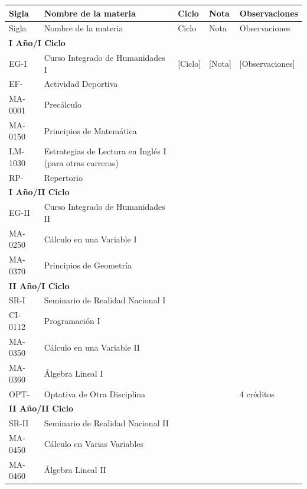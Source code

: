 \begin{longtable}{|p{2cm}|p{7cm}|p{1.6cm}|p{1.6cm}|p{2.8cm}|}
\hline
\rowcolor[HTML]{00C0F3}
Sigla & Nombre de la materia & Ciclo & Nota & Observaciones \\ \hline
\endfirsthead
\hline
\rowcolor[HTML]{00C0F3}
Sigla & Nombre de la materia & Ciclo & Nota & Observaciones \\ \hline
\endhead
\multicolumn{5}{|l|}{\cellcolor[HTML]{E6E6E6}\textbf{I Año/I Ciclo}} \\ \hline
EG-I & Curso Integrado de Humanidades I & [Ciclo] & [Nota] & [Observaciones] \\ \hline
EF- & Actividad Deportiva &  &  &  \\ \hline
MA-0001 & Precálculo &  &  &  \\ \hline
MA-0150 & Principios de Matemática &  &  &  \\ \hline
LM-1030 & Estrategias de Lectura en Inglés I (para otras carreras) &  &  &  \\ \hline
RP- & Repertorio &  &  &  \\ \hline
\multicolumn{5}{|l|}{\cellcolor[HTML]{E6E6E6}\textbf{I Año/II Ciclo}} \\ \hline
EG-II & Curso Integrado de Humanidades II &  &  &  \\ \hline
MA-0250 & Cálculo en una Variable I &  &  &  \\ \hline
MA-0370 & Principios de Geometría &  &  &  \\ \hline
\multicolumn{5}{|l|}{\cellcolor[HTML]{E6E6E6}\textbf{II Año/I Ciclo}} \\ \hline
SR-I & Seminario de Realidad Nacional I &  &  &  \\ \hline
CI-0112 & Programación I &  &  &  \\ \hline
MA-0350 & Cálculo en una Variable II &  &  &  \\ \hline
MA-0360 & Álgebra Lineal I &  &  &  \\ \hline
OPT- & Optativa de Otra Disciplina &  &  & 4 créditos \\ \hline
\multicolumn{5}{|l|}{\cellcolor[HTML]{E6E6E6}\textbf{II Año/II Ciclo}} \\ \hline
SR-II & Seminario de Realidad Nacional II &  &  &  \\ \hline
MA-0450 & Cálculo en Varias Variables &  &  &  \\ \hline
MA-0460 & Álgebra Lineal II &  &  &  \\ \hline

\end{longtable}
